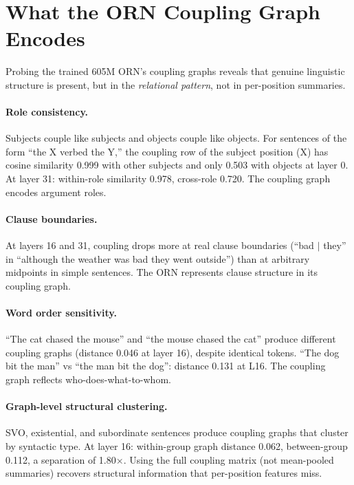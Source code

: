 \documentclass[11pt, a4paper]{article}
\theoremstyle{plain}
\theoremstyle{definition}
\theoremstyle{remark}
\begin{document}
\section{What the ORN Coupling Graph Encodes}
\label{app:coupling-structure}

Probing the trained 605M ORN's coupling graphs reveals that genuine linguistic structure is present, but in the \emph{relational pattern}, not in per-position summaries.

\paragraph{Role consistency.}
Subjects couple like subjects and objects couple like objects.
For sentences of the form ``the X verbed the Y,'' the coupling row of the subject position (X) has cosine similarity 0.999 with other subjects and only 0.503 with objects at layer 0.
At layer 31: within-role similarity 0.978, cross-role 0.720.
The coupling graph encodes argument roles.

\paragraph{Clause boundaries.}
At layers 16 and 31, coupling drops more at real clause boundaries (``bad $|$ they'' in ``although the weather was bad they went outside'') than at arbitrary midpoints in simple sentences.
The ORN represents clause structure in its coupling graph.

\paragraph{Word order sensitivity.}
``The cat chased the mouse'' and ``the mouse chased the cat'' produce different coupling graphs (distance 0.046 at layer 16), despite identical tokens.
``The dog bit the man'' vs ``the man bit the dog'': distance 0.131 at L16.
The coupling graph reflects who-does-what-to-whom.

\paragraph{Graph-level structural clustering.}
SVO, existential, and subordinate sentences produce coupling graphs that cluster by syntactic type.
At layer 16: within-group graph distance 0.062, between-group 0.112, a separation of 1.80$\times$.
Using the full coupling matrix (not mean-pooled summaries) recovers structural information that per-position features miss.
\end{document}
